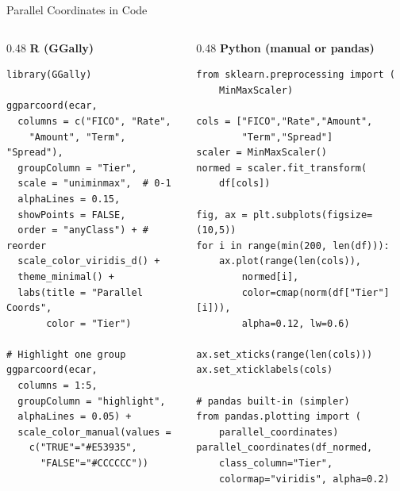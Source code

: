 \documentclass[10pt]{beamer}
\begin{document}
\begin{frame}[fragile]{Parallel Coordinates in Code}
  \begin{columns}[T]
    \begin{column}{0.48\textwidth}
      \textbf{R (GGally)}
\begin{lstlisting}[style=rstyle]
library(GGally)

ggparcoord(ecar,
  columns = c("FICO", "Rate",
    "Amount", "Term", "Spread"),
  groupColumn = "Tier",
  scale = "uniminmax",  # 0-1
  alphaLines = 0.15,
  showPoints = FALSE,
  order = "anyClass") + # reorder
  scale_color_viridis_d() +
  theme_minimal() +
  labs(title = "Parallel Coords",
       color = "Tier")

# Highlight one group
ggparcoord(ecar,
  columns = 1:5,
  groupColumn = "highlight",
  alphaLines = 0.05) +
  scale_color_manual(values =
    c("TRUE"="#E53935",
      "FALSE"="#CCCCCC"))
\end{lstlisting}
    \end{column}
    \begin{column}{0.48\textwidth}
      \textbf{Python (manual or pandas)}
\begin{lstlisting}[style=pythonstyle]
from sklearn.preprocessing import (
    MinMaxScaler)

cols = ["FICO","Rate","Amount",
        "Term","Spread"]
scaler = MinMaxScaler()
normed = scaler.fit_transform(
    df[cols])

fig, ax = plt.subplots(figsize=(10,5))
for i in range(min(200, len(df))):
    ax.plot(range(len(cols)),
        normed[i],
        color=cmap(norm(df["Tier"][i])),
        alpha=0.12, lw=0.6)

ax.set_xticks(range(len(cols)))
ax.set_xticklabels(cols)

# pandas built-in (simpler)
from pandas.plotting import (
    parallel_coordinates)
parallel_coordinates(df_normed,
    class_column="Tier",
    colormap="viridis", alpha=0.2)
\end{lstlisting}
    \end{column}
  \end{columns}
\end{frame}
\end{document}
